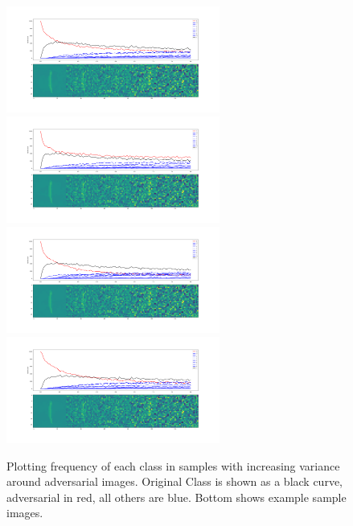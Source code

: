 \documentclass[10pt]{extarticle}
\begin{document}
\begin{figure}[H]
\label{fgsme}
\includegraphics[trim=200 80 100 100, clip,width=7cm]{2019-04-10-adverse/Image918-O1A6_varx40.png}\includegraphics[trim=200 80 100 100, clip,width=7cm]{2019-04-10-adverse/Image918-O1A7_varx40.png}
\includegraphics[trim=200 80 100 100, clip,width=7cm]{2019-04-10-adverse/Image918-O1A8_varx40.png}\includegraphics[trim=200 80 100 100, clip,width=7cm]{2019-04-10-adverse/Image918-O1A9_varx40.png}
\caption{Plotting frequency of each class in samples with increasing variance around adversarial images. Original Class is shown as a black curve, adversarial in red, all others are blue. Bottom shows example sample images. }
\end{figure}
\end{document}
